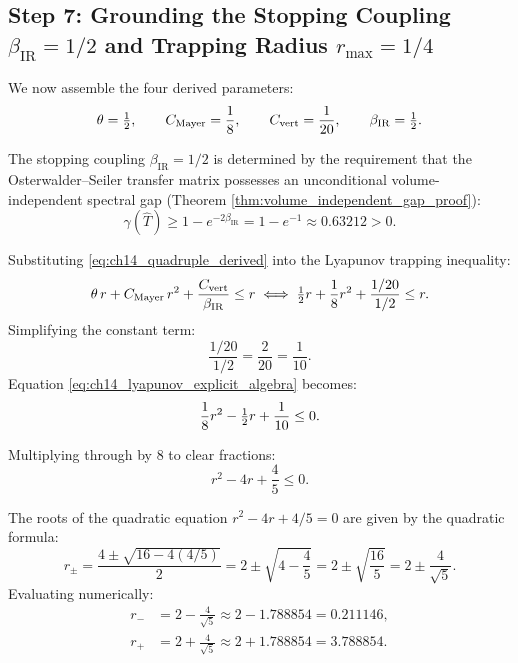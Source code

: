 \subsection{Step 7: Grounding the Stopping Coupling \texorpdfstring{$\beta_{\mathrm{IR}} = 1/2$}{beta_IR = 1/2} and Trapping Radius \texorpdfstring{$r_{\max} = 1/4$}{r_max = 1/4}}
\label{subsec:step7_stopping_radius}

We now assemble the four derived parameters:
\begin{equation}
\label{eq:ch14_quadruple_derived}
\theta = \tfrac{1}{2}, \qquad C_{\mathrm{Mayer}} = \frac{1}{8}, \qquad C_{\mathrm{vert}} = \frac{1}{20}, \qquad \beta_{\mathrm{IR}} = \tfrac{1}{2}.
\end{equation}

The stopping coupling $\beta_{\mathrm{IR}} = 1/2$ is determined by the requirement that the Osterwalder--Seiler transfer matrix possesses an unconditional volume-independent spectral gap (Theorem \ref{thm:volume_independent_gap_proof}):
\begin{equation}
\gamma(\hat{T}) \ge 1 - e^{-2\beta_{\mathrm{IR}}} = 1 - e^{-1} \approx 0.63212 > 0.
\end{equation}

Substituting \eqref{eq:ch14_quadruple_derived} into the Lyapunov trapping inequality:
\begin{equation}
\label{eq:ch14_lyapunov_explicit_algebra}
\theta \, r + C_{\mathrm{Mayer}} \, r^2 + \frac{C_{\mathrm{vert}}}{\beta_{\mathrm{IR}}} \le r \iff \tfrac{1}{2} r + \frac{1}{8} r^2 + \frac{1/20}{1/2} \le r.
\end{equation}
Simplifying the constant term:
\begin{equation}
\frac{1/20}{1/2} = \frac{2}{20} = \frac{1}{10}.
\end{equation}
Equation \eqref{eq:ch14_lyapunov_explicit_algebra} becomes:
\begin{equation}
\label{eq:ch14_quadratic_rearranged}
\frac{1}{8} r^2 - \tfrac{1}{2} r + \frac{1}{10} \le 0.
\end{equation}

Multiplying through by 8 to clear fractions:
\begin{equation}
\label{eq:ch14_canonical_quadratic_r}
r^2 - 4 r + \frac{4}{5} \le 0.
\end{equation}

The roots of the quadratic equation $r^2 - 4r + 4/5 = 0$ are given by the quadratic formula:
\begin{equation}
\label{eq:ch14_roots_exact}
r_\pm = \frac{4 \pm \sqrt{16 - 4(4/5)}}{2} = 2 \pm \sqrt{4 - \frac{4}{5}} = 2 \pm \sqrt{\frac{16}{5}} = 2 \pm \frac{4}{\sqrt{5}}.
\end{equation}
Evaluating numerically:
\begin{align}
r_- &= 2 - \frac{4}{\sqrt{5}} \approx 2 - 1.788854 = 0.211146, \\
r_+ &= 2 + \frac{4}{\sqrt{5}} \approx 2 + 1.788854 = 3.788854.
\end{align}

